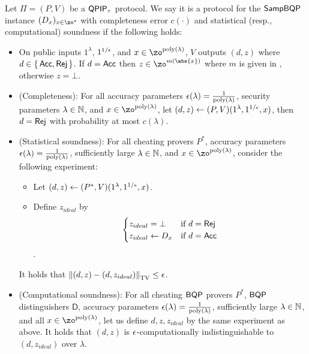 \begin{definition}
    \label{dfn:stats-secure-proto-sampbqp}
    Let $\Pi=(P, V)$ be a $\operatorname{\mathsf{QPIP}}_\tau$ protocol.
    We say it is a protocol for the $\operatorname{\mathsf{SampBQP}}$ instance $(D_x)_{x\in\zo^*}$ with completeness error $c(\cdot)$ and statistical (resp., computational) soundness if the following holds:
    \begin{itemize}
        \item On public inputs $1^\lambda$, $1^{1/\epsilon}$, and $x\in\zo^{\poly(\lambda)}$, $V$ outputs $(d, z)$ where $d\in\set{\mathsf{Acc}, \mathsf{Rej}}$.
            If $d=\mathsf{Acc}$ then $z\in\zo^{m(\abs{x})}$ where $m$ is given in , otherwise $z=\bot$.
        \item (Completeness):
            For all accuracy parameters $\epsilon(\lambda)=\frac{1}{\operatorname*{\operatorname{poly}}(\lambda)}$,
            security parameters $\lambda\in\mathbb{N}$,
            and $x\in\zo^{\poly(\lambda)}$,
            let $(d, z)\leftarrow(P, V)(1^\lambda, 1^{1/\epsilon}, x)$, then $d=\mathsf{Rej}$ with probability at most $c(\lambda)$.
        \item (Statistical soundness): For all cheating provers $P^*$,
            accuracy parameters $\epsilon(\lambda)=\frac{1}{\operatorname*{\operatorname{poly}}(\lambda)}$,
            sufficiently large $\lambda\in\mathbb{N}$, and $x\in\zo^{\poly(\lambda)}$,
            consider the following experiment:
            \begin{itemize}
                \item Let $(d, z)\leftarrow(P^*, V)(1^\lambda, 1^{1/\epsilon}, x)$.
                \item Define $z_{ideal}$ by
                $$\begin{cases}
                    z_{ideal}=\bot & \text{if } d=\mathsf{Rej}\\
                    z_{ideal}\leftarrow D_x & \text{if } d=\mathsf{Acc}
                \end{cases}$$.
            \end{itemize}
            It holds that $\left\lVert(d,z)-(d,z_{ideal})\right\rVert_{\mathrm{TV}}\leq\epsilon$.
		\item (Computational soundness):
        For all cheating $\operatorname{\mathsf{BQP}}$ provers $P^*$, $\operatorname{\mathsf{BQP}}$ distinguishers $\mathsf{D}$, accuracy parameters $\epsilon(\lambda)=\frac{1}{\operatorname*{\operatorname{poly}}(\lambda)}$,
            sufficiently large $\lambda\in\mathbb{N}$, and all $x\in\zo^{\poly(\lambda)}$,
            let us define $d, z, z_{ideal}$ by the same experiment as above.
            It holds that $(d, z)$ is $\epsilon$-computationally indistinguishable to $(d, z_{ideal})$ over $\lambda$.
    \end{itemize}
\end{definition}

